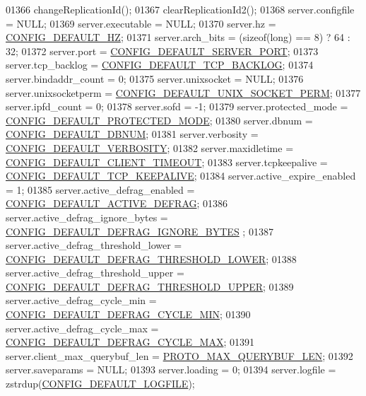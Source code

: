 \begin{DoxyCode}
{{{{{{{{{{{{{{{01366     changeReplicationId();
01367     clearReplicationId2();
01368     server.configfile = NULL;
01369     server.executable = NULL;
01370     server.hz = \hyperlink{server_8h_aa5a3b127e21d6bf089025d953c44678a}{CONFIG\_DEFAULT\_HZ};
01371     server.arch\_bits = (\textcolor{keyword}{sizeof}(\textcolor{keywordtype}{long}) == 8) ? 64 : 32;
01372     server.port = \hyperlink{server_8h_afc9f3396e2da1194ef2ccc6ab97d4e3d}{CONFIG\_DEFAULT\_SERVER\_PORT};
01373     server.tcp\_backlog = \hyperlink{server_8h_ab85c155ec2652313a561af139fdb5575}{CONFIG\_DEFAULT\_TCP\_BACKLOG};
01374     server.bindaddr\_count = 0;
01375     server.unixsocket = NULL;
01376     server.unixsocketperm = \hyperlink{server_8h_a486eb6d6b0e44a772877112dbd928494}{CONFIG\_DEFAULT\_UNIX\_SOCKET\_PERM};
01377     server.ipfd\_count = 0;
01378     server.sofd = -1;
01379     server.protected\_mode = \hyperlink{server_8h_aa84cedc4d9e3da82d28324a85626a666}{CONFIG\_DEFAULT\_PROTECTED\_MODE};
01380     server.dbnum = \hyperlink{server_8h_abc5ff12d4e9b662f85d2cb11a0220926}{CONFIG\_DEFAULT\_DBNUM};
01381     server.verbosity = \hyperlink{server_8h_a407337e4d193cc8fc965938b7a247240}{CONFIG\_DEFAULT\_VERBOSITY};
01382     server.maxidletime = \hyperlink{server_8h_a1d6ca2cad092805de3acd7b74876a323}{CONFIG\_DEFAULT\_CLIENT\_TIMEOUT};
01383     server.tcpkeepalive = \hyperlink{server_8h_a2c8d2290c3ac70d63ed2e62b11ab566b}{CONFIG\_DEFAULT\_TCP\_KEEPALIVE};
01384     server.active\_expire\_enabled = 1;
01385     server.active\_defrag\_enabled = \hyperlink{server_8h_a7bc03a080189821c8c88b31027281d4b}{CONFIG\_DEFAULT\_ACTIVE\_DEFRAG};
01386     server.active\_defrag\_ignore\_bytes = \hyperlink{server_8h_aed98ddd341b643d52417b875418b2ecb}{CONFIG\_DEFAULT\_DEFRAG\_IGNORE\_BYTES}
      ;
01387     server.active\_defrag\_threshold\_lower = 
      \hyperlink{server_8h_a9d23ea1ff80f9db5faef6f5aca6f76aa}{CONFIG\_DEFAULT\_DEFRAG\_THRESHOLD\_LOWER};
01388     server.active\_defrag\_threshold\_upper = 
      \hyperlink{server_8h_a75b8ce2fafb93ddeb96f0e5602c2bd0c}{CONFIG\_DEFAULT\_DEFRAG\_THRESHOLD\_UPPER};
01389     server.active\_defrag\_cycle\_min = \hyperlink{server_8h_a5d49d5c9a11564577f7e78d6f52d9db5}{CONFIG\_DEFAULT\_DEFRAG\_CYCLE\_MIN};
01390     server.active\_defrag\_cycle\_max = \hyperlink{server_8h_ac3f69c7e78a189639eab66a2b32753d0}{CONFIG\_DEFAULT\_DEFRAG\_CYCLE\_MAX};
01391     server.client\_max\_querybuf\_len = \hyperlink{server_8h_a395f766c5962e4ee2da01dee43600f7a}{PROTO\_MAX\_QUERYBUF\_LEN};
01392     server.saveparams = NULL;
01393     server.loading = 0;
01394     server.logfile = zstrdup(\hyperlink{server_8h_a0698b50ff7fe51afd74cf20a72b75e1b}{CONFIG\_DEFAULT\_LOGFILE});
}}}}}}}}}}}}}}}
\end{DoxyCode}
